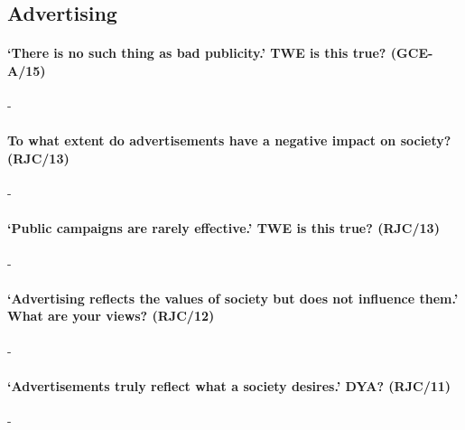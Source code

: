 \documentclass[../../main]{subfiles}
\begin{document}
\subsection{Advertising}

\paragraph{`There is no such thing as bad publicity.' TWE is this true? (GCE-A/15)}-

\paragraph{To what extent do advertisements have a negative impact on society? (RJC/13)}-

\paragraph{`Public campaigns are rarely effective.' TWE is this true? (RJC/13)}-

\paragraph{`Advertising reflects the values of society but does not influence them.' What are your views? (RJC/12)}-

\paragraph{`Advertisements truly reflect what a society desires.' DYA? (RJC/11)}-
\end{document}
